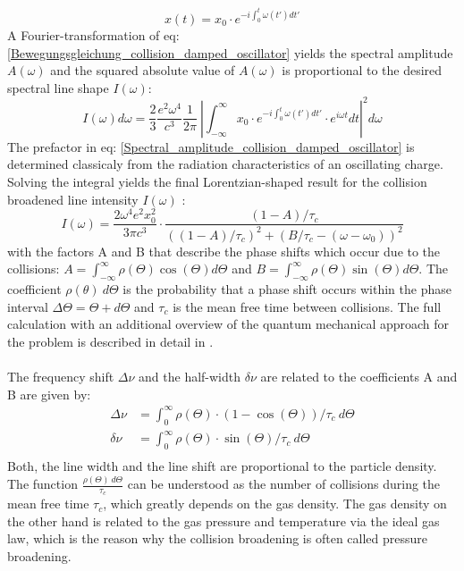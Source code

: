 \begin{equation}
x(t)=x_0\cdot e^{-i\int_{0}^{t}\omega(t')dt'}
\label{Bewegungsgleichung_collision_damped_oscillator}
\end{equation}
A Fourier-transformation of eq: \ref{Bewegungsgleichung_collision_damped_oscillator} yields the spectral amplitude $A(\omega)$ and the squared absolute value of $A(\omega)$ is proportional to the desired spectral line shape $I(\omega)$: 
\begin{equation}
I(\omega) d\omega =\frac{2}{3}\frac{e^2\omega^4}{c^3} \frac{1}{2\pi}\ \left|\int_{-\infty}^{\infty} x_0\cdot e^{-i\int_{0}^{t}\omega(t')dt'} \cdot e^{i\omega t} dt \right|^2d\omega
\label{Spectral_amplitude_collision_damped_oscillator}
\end{equation}
The prefactor in eq: \ref{Spectral_amplitude_collision_damped_oscillator} is determined classicaly from the radiation characteristics of an oscillating charge. Solving the integral yields the final Lorentzian-shaped result for the collision broadened line intensity  $I(\omega)$ :
\begin{equation}
	I(\omega)=\frac{2\omega^4e^2x_0^2}{3\pi c^3}\cdot \frac{(1-A)/\tau_c}{\left((1-A)/\tau_c\right)^2+\left(B/\tau_c-( \omega-\omega_0) \right)^2}
	\label{Linienform_collision_damped_oscillator}
\end{equation}
with the factors A and B that describe the phase shifts which occur due to the collisions: $A=\int_{-\infty}^{\infty} \rho(\Theta) \cos(\Theta) d\Theta $ and $B=\int_{-\infty}^{\infty} \rho(\Theta) \sin(\Theta) d\Theta $. The coefficient $\rho(\theta)\ d\Theta$ is the probability that a phase shift occurs within the phase interval $\Delta\Theta= \Theta+d \Theta$ and $\tau_c$ is the mean free time between collisions.
The full calculation with an additional overview of the quantum mechanical approach for the problem is described in detail in \cite{chen1957}.\\ \\ 
The frequency shift $\Delta \nu$ and the half-width $\delta \nu$ are related to the                                           coefficients A and B are given by: 
\begin{align}
\Delta \nu&=\int_{0}^{\infty} \rho(\Theta)\cdot \left( 1-\cos(\Theta)\right)/\tau_c \ d\Theta  \\
\delta \nu&=\int_{0}^{\infty} \rho(\Theta)\cdot \sin(\Theta)/\tau_c \ d\Theta \\ \nonumber
\end{align}
Both, the line width and the line shift are proportional to the particle density. The function $\frac{\rho(\Theta) \ d\Theta }{ \tau_c}$ can be understood as the number of collisions during the mean free time $\tau_c$, which greatly depends on the gas density. The gas density on the other hand is related to the gas pressure and temperature via the ideal gas law, which is the reason why the collision broadening is often called pressure broadening. 
